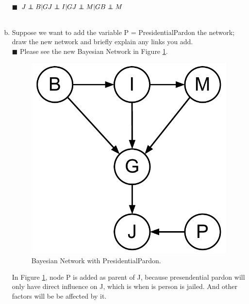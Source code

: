\documentclass{article}
\newcommand{\solution}[1]{~\\ $\blacksquare$ \sffamily\upshape\selectfont #1
\normalfont ~\\~ }
\newcommand\independent{\protect\mathpalette{\protect\independenT}{\perp}}
\def\independenT#1#2{\mathrel{\rlap{$#1#2$}\mkern2mu{#1#2}}}
\begin{document}
\begin{enumerate}[a.]
  \solution{$
J\independent{B|G} \\
J\independent{I|G} \\
J\independent{M|G} \\
B\independent{M}
$}
\item Suppose we want to add the variable P =  PresidentialPardon the
network; draw the new network and briefly explain any links you add.
\solution{Please see the new Bayesian Network in Figure \ref{fig:14_14}.
  \begin{figure}[ht]
    \centering
    \includegraphics[width=.5\textwidth]{AI-HWK-2_14_14.pdf}
    \caption{Bayesian Network with PresidentialPardon.}\label{fig:14_14}
  \end{figure}
  In Figure \ref{fig:14_14}, node P is added as parent of J, because
  presendential pardon will only have direct influence on J, which is
  when is person is jailed. And other factors will be be affected by
  it. 
}
\end{enumerate}
\end{document}
